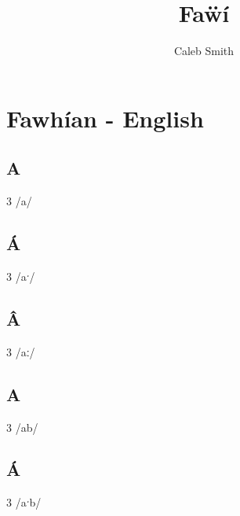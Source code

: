 \documentclass[10pt,a4paper,twoside]{book}
\title{Faẅí}
\author{Caleb Smith} %
\begin{document}

% 


\chapter{Fawhían - English}


\section*{A}

\begin{multicols}{3}
 {/a/} {}
\end{multicols}

\section*{Á}

\begin{multicols}{3}
 {/aˑ/} {}
\end{multicols}

\section*{Â}

\begin{multicols}{3}
 {/aː/} {}
\end{multicols}

\section*{A}

\begin{multicols}{3}
 {/ab/} {}
\end{multicols}

\section*{Á}

\begin{multicols}{3}
 {/aˑb/} {}
\end{multicols}
\end{document}

